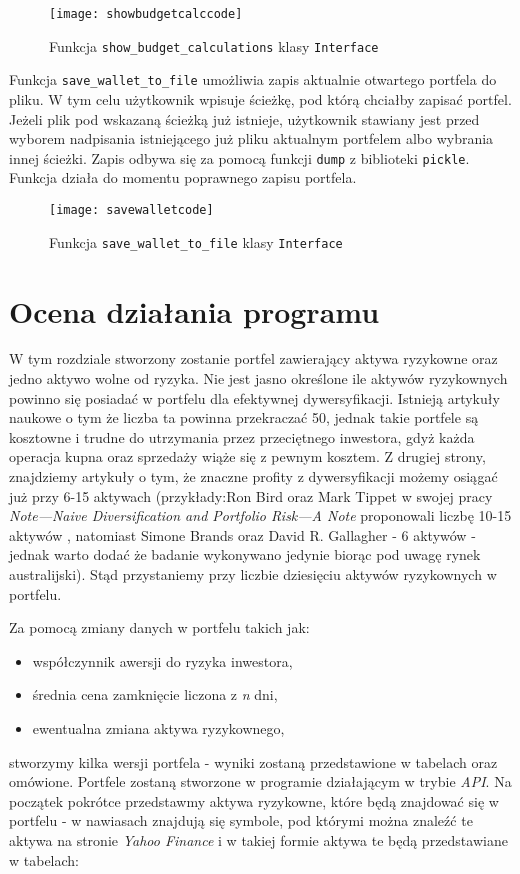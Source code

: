 \documentclass[magister]{dyplom}
\def\code#1{\texttt{#1}}
\begin{document}
\begin{figure}[h]
	\centering
	\texttt{[image: showbudgetcalccode]}
	\caption{Funkcja \code{show\_budget\_calculations} klasy \code{Interface}}
\end{figure}

\newpage
Funkcja \code{save\_wallet\_to\_file} umożliwia zapis aktualnie otwartego portfela do pliku. W tym celu użytkownik wpisuje ścieżkę, pod którą chciałby zapisać portfel. Jeżeli plik pod wskazaną ścieżką już istnieje, użytkownik stawiany jest przed wyborem nadpisania istniejącego już pliku aktualnym portfelem albo wybrania innej ścieżki. Zapis odbywa się za pomocą funkcji \code{dump} z biblioteki \code{pickle}. Funkcja działa do momentu poprawnego zapisu portfela.

\begin{figure}[h]
	\centering
	\texttt{[image: savewalletcode]}
	\caption{Funkcja \code{save\_wallet\_to\_file} klasy \code{Interface}}
\end{figure}
\chapter{Ocena działania programu}

W tym rozdziale stworzony zostanie portfel zawierający aktywa ryzykowne oraz jedno aktywo wolne od ryzyka. Nie jest jasno określone ile aktywów ryzykownych powinno się posiadać w portfelu dla efektywnej dywersyfikacji. Istnieją artykuły naukowe o tym że liczba ta powinna przekraczać 50, jednak takie portfele są kosztowne i trudne do utrzymania przez przeciętnego inwestora, gdyż każda operacja kupna oraz sprzedaży wiąże się z pewnym kosztem. Z drugiej strony, znajdziemy artykuły o tym, że znaczne profity z dywersyfikacji możemy osiągać już przy 6-15 aktywach (przykłady:Ron Bird oraz Mark Tippet w swojej pracy \textit{Note---Naive Diversification and Portfolio Risk---A Note} proponowali liczbę 10-15 aktywów \cite{birdtippett}, natomiast Simone Brands oraz David R. Gallagher - 6 aktywów - jednak warto dodać że badanie wykonywano jedynie biorąc pod uwagę rynek australijski\cite{brandsgallagher})\cite{howmanystocks}. Stąd przystaniemy przy liczbie dziesięciu aktywów ryzykownych w portfelu.

Za pomocą zmiany danych w portfelu takich jak:

\begin{itemize}
	\item współczynnik awersji do ryzyka inwestora,
	\item średnia cena zamknięcie liczona z \textit{n} dni,
	\item ewentualna zmiana aktywa ryzykownego,
\end{itemize}
stworzymy kilka wersji portfela - wyniki zostaną przedstawione w tabelach oraz omówione. Portfele zostaną stworzone w programie działającym w trybie \textit{API}.
Na początek pokrótce przedstawmy aktywa ryzykowne, które będą znajdować się w portfelu - w nawiasach znajdują się symbole, pod którymi można znaleźć te aktywa na stronie \textit{Yahoo Finance} i w takiej formie aktywa te będą przedstawiane w tabelach:
\end{document}
